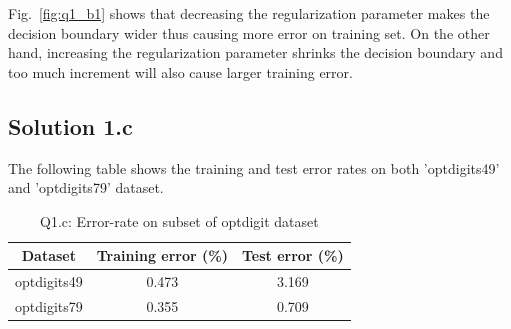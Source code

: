 Fig.~\ref{fig:q1_b1} shows that decreasing the regularization parameter makes the decision boundary wider thus causing more error on training set. On the other hand, increasing the regularization parameter shrinks the decision boundary and too much increment will also cause larger training error.
\subsection*{Solution 1.c}
The following table shows the training and test error rates on both 'optdigits49' and 'optdigits79' dataset.
\begin{table}[h!]
	\begin{center}
		\begin{tabular}{||c | c | c ||} 
			\hline
			Dataset & Training error (\%) & Test error (\%)\\ [0.5ex] 
			\hline\hline
			optdigits49 & 0.473 & 3.169\\ [0.5ex]
			\hline
			optdigits79 & 0.355 & 0.709\\ [1ex]
			\hline
		\end{tabular}
	\end{center}
	\caption{Q1.c: Error-rate on subset of optdigit dataset}
\end{table}